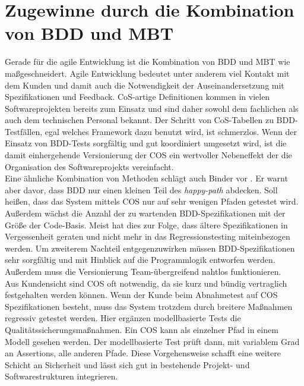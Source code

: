 \section{Zugewinne durch die Kombination von BDD und MBT}
Gerade für die agile Entwicklung ist die Kombination von BDD und \Gls{MBT} wie maßgeschneidert. Agile Entwicklung bedeutet unter anderem viel Kontakt mit dem Kunden und damit auch die Notwendigkeit der Auseinandersetzung mit Spezifikationen und Feedback. CoS-artige Definitionen kommen in vielen Softwareprojekten bereits zum Einsatz und sind daher sowohl dem fachlichen als auch dem technischen Personal bekannt. Der Schritt von CoS-Tabellen zu BDD-Testfällen, egal welches Framework dazu benutzt wird, ist schmerzlos. Wenn der Einsatz von BDD-Tests sorgfältig und gut koordiniert umgesetzt wird, ist die damit einhergehende Versionierung der \Gls{COS} ein wertvoller Nebeneffekt der die Organisation des Softwareprojekts vereinfacht.\\
Eine ähnliche Kombination von Methoden schlägt auch Binder vor \cite{binder_model-based_2014}. Er warnt aber davor, dass BDD nur einen kleinen Teil des \textit{happy-path} abdecken. Soll heißen, dass das System mittels \Gls{COS} nur auf sehr wenigen Pfaden getestet wird. Außerdem wächst die Anzahl der zu wartenden BDD-Spezifikationen mit der Größe der Code-Basis. Meist hat dies zur Folge, dass ältere Spezifikationen in Vergessenheit geraten und nicht mehr in das Regressionstesting miteinbezogen werden. Um zweiterem Nachteil entgegenzuwirken müssen BDD-Spezifikationen sehr sorgfältig und mit Hinblick auf die Programmlogik entworfen werden. Außerdem muss die Versionierung Team-übergreifend nahtlos funktionieren.\\
Aus Kundensicht sind \Gls{COS} oft notwendig, da sie kurz und bündig vertraglich festgehalten werden können. Wenn der Kunde beim Abnahmetest auf \Gls{COS} Spezifikationen besteht, muss das System trotzdem durch breitere Maßnahmen regressiv getestet werden. Hier ergänzen modellbasierte Tests die Qualitätssicherungsmaßnahmen. Ein \Gls{COS} kann als einzelner Pfad in einem Modell gesehen werden. Der modellbasierte Test prüft dann, mit variablem Grad an Assertions, alle anderen Pfade. Diese Vorgehensweise schafft eine weitere Schicht an Sicherheit und lässt sich gut in bestehende Projekt- und Softwarestrukturen integrieren.













